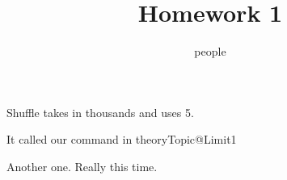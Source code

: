 \documentclass[handout]{ximera}
\title{Homework 1}
\author{people}
\begin{document}
\maketitle
\renewcommand{\QuestionSelect}{It called our command in theory}
Shuffle takes in thousands and uses 5.

\begin{shuffle}[5]
\QuestionSelect{}{}{Topic@Limit}{}{1}
\end{shuffle}

%
%
%
%
%

Another one.  Really this time.
\end{document}
